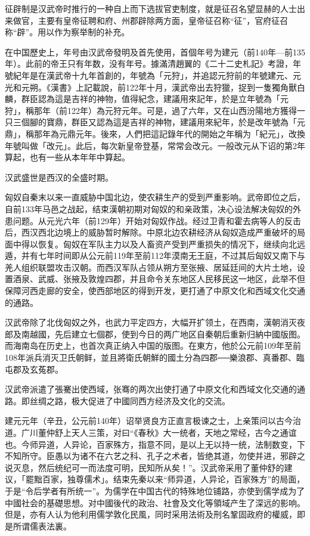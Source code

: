 征辟制是汉武帝时推行的一种自上而下选拔官吏制度，就是征召名望显赫的人士出来做官，主要有皇帝征聘和府、州郡辟除两方面，皇帝征召称“征”，官府征召称“辟”。用以作为察举制的补充。

在中国歷史上，年号由汉武帝發明及首先使用，首個年号为建元（前140年—前135年）。此前的帝王只有年数，没有年号。據滿清趙翼的《二十二史札記》考證，年號紀年是在漢武帝十九年首創的，年號為「元狩」，并追認元狩前的年號建元、元光和元朔。《漢書》上記載說，前122年十月，漢武帝出去狩獵，捉到一隻獨角獸白麟，群臣認為這是吉祥的神物，值得紀念，建議用來記年，於是立年號為「元狩」，稱那年（前122年）為元狩元年。可是，過了六年，又在山西汾陽地方獲得一只三個腳的寶鼎，群臣又認為這是吉祥的神物，建議用來紀年，於是改年號為「元鼎」，稱那年為元鼎元年。後來，人們把這記錄年代的開始之年稱为「紀元」，改換年號叫做「改元」。此后，每次新皇帝登基，常常会改元。一般改元从下诏的第2年算起，也有一些从本年年中算起。

汉武盛世是西汉的全盛时期。

匈奴自秦末以来一直威胁中国北边，使农耕生产的受到严重影响。武帝即位之后，自前133年马邑之战起，结束漢朝初期对匈奴的和亲政策，决心设法解决匈奴的外患问题。从元光六年（前129年）开始对匈奴作战。经过卫青和霍去病等人的反击后，西汉西北边境上的威胁暂时解除。中原北边农耕经济从匈奴造成严重破坏的局面中得以恢复。匈奴在军队主力以及人畜资产受到严重损失的情况下，继续向北远遁，并有七年时间即从公元前119年至前112年漠南无王庭，不过其后匈奴又南下与羌人组织联盟攻击汉朝。而西汉军队占领从朔方至张掖、居延廷间的大片土地，设置酒泉、武威、张掖及敦煌四郡，并且命令关东地区人民移民这一地区，此举不但保障河西走廊的安全，使西部地区的得到开发，更打通了中原文化和西域文化交通的通路。

汉武帝除了北伐匈奴之外，也武力平定四方，大幅开扩领土，在西南，漢朝消灭夜郎及南越國，先后建立七個郡，使到今日的两广地区自秦朝后重新归納中國版图。而海南岛在历史上，也首次真正纳入中国的版图。在東方，他於公元前109年至前108年派兵消灭卫氏朝鲜，並且將衛氏朝鮮的國土分為四郡──樂浪郡、真番郡、臨屯郡及玄菟郡。

汉武帝派遣了張騫出使西域，张骞的两次出使打通了中原文化和西域文化交通的通路。即丝绸之路，极大促进了中國同西方经济及文化的交流。

建元元年（辛丑，公元前140年）诏举贤良方正直言极谏之士，上亲策问以古今治道。广川董仲舒上天人三策，对曰“《春秋》大一统者，天地之常经，古今之通谊也。今师异道，人异论，百家殊方，指意不同，是以上无以持一统，法制数变，下不知所守。臣愚以为诸不在六艺之科、孔子之术者，皆绝其道，勿使并进，邪辟之说灭息，然后统纪可一而法度可明，民知所从矣！”。汉武帝采用了董仲舒的建议，「罷黜百家，独尊儒术」。结束先秦以来“师异道，人异论，百家殊方”的局面，于是“令后学者有所统一”。为儒学在中国古代的特殊地位铺路，亦使到儒学成为了中國社会的基礎思想。对中國後代的政治、社會及文化等領域产生了深远的影响。但是，亦有人认为他利用儒学敦化民風，同时采用法術及刑名鞏固政府的權威，即是所谓儒表法裏。


